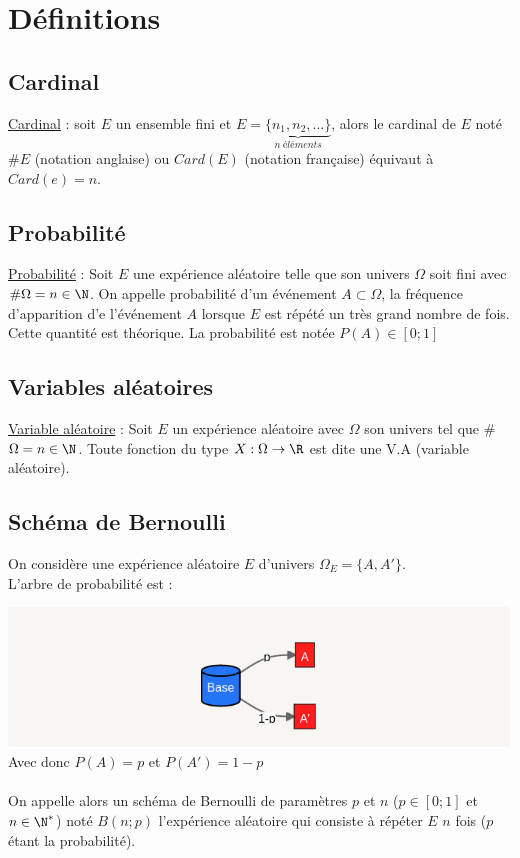 \documentclass{report}
\begin{document}
\section{Définitions}

\subsection{Cardinal}
\underline{Cardinal} : soit $E$ un ensemble fini et $E = \underbrace{\{n_1, n_2, \dots \}}_{n \; éléments}$, alors le cardinal de $E$ noté $\#E$ (notation anglaise) ou $Card(E)$ (notation française) équivaut à $Card(e) = n$.

\subsection{Probabilité}
\underline{Probabilité} : Soit $E$ une expérience aléatoire telle que son univers $\Omega$ soit fini avec $\# \Omega = n \in \N$. On appelle probabilité d’un événement $A \subset \Omega$, la fréquence d’apparition d’e l’événement $A$ lorsque $E$ est répété un très grand nombre de fois. Cette quantité est théorique. La probabilité est notée $P(A) \in [0;1]$

\subsection{Variables aléatoires}
\underline{Variable aléatoire} : Soit $E$ un expérience aléatoire avec $\Omega $ son univers tel que #$\Omega = n \in \N$. Toute fonction du type $X : \Omega \rightarrow \R$ est dite une V.A (variable aléatoire).

\subsection{Schéma de Bernoulli}
On considère une expérience aléatoire $E$ d’univers $\Omega_E = \{A,A'\}$. \\
L’arbre de probabilité est :

\includegraphics[width=\textwidth]{schema_bernouilli_1.png}
Avec donc $P(A) = p$  et $P(A')=1-p$ \\ \\
On appelle alors un schéma de Bernoulli de paramètres $p$  et $n$ ($p \in [0;1]$ et $n \in \N^*$) noté $B(n;p)$ l’expérience aléatoire qui consiste à répéter $E$ $n$ fois ($p$ étant la probabilité).
\end{document}
